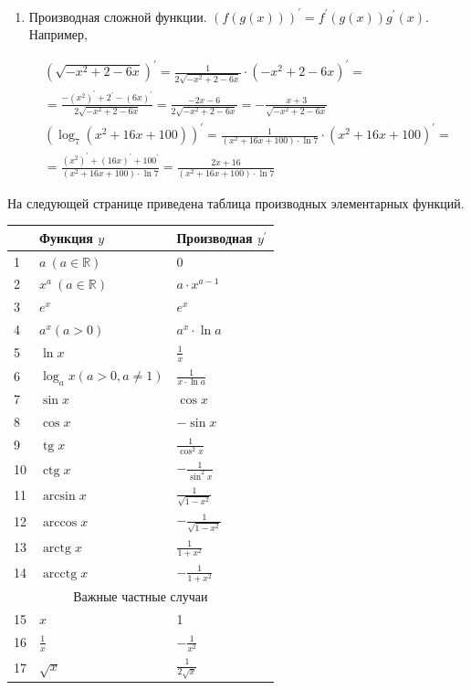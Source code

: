\begin{enumerate}
    \item Производная сложной функции. $(f(g(x)))^{\prime}=f^{\prime}(g(x)) g^{\prime}(x)$. Например,

    $$
    \begin{gathered}
    \left(\sqrt{-x^2+2-6 x}\right)^{\prime}=\frac{1}{2 \sqrt{-x^2+2-6 x}} \cdot\left(-x^2+2-6 x\right)^{\prime}= \\
    =\frac{-\left(x^2\right)^{\prime}+2^{\prime}-(6 x)^{\prime}}{2 \sqrt{-x^2+2-6 x}}=\frac{-2 x-6}{2 \sqrt{-x^2+2-6 x}}=-\frac{x+3}{\sqrt{-x^2+2-6 x}} \\
    \left(\log _7\left(x^2+16 x+100\right)\right)^{\prime}=\frac{1}{\left(x^2+16 x+100\right) \cdot \ln 7} \cdot\left(x^2+16 x+100\right)^{\prime}= \\
    =\frac{\left(x^2\right)^{\prime}+(16 x)^{\prime}+100^{\prime}}{\left(x^2+16 x+100\right) \cdot \ln 7}=\frac{2 x+16}{\left(x^2+16 x+100\right) \cdot \ln 7}
    \end{gathered}
    $$
\end{enumerate}

На следующей странице приведена таблица производных элементарных функций.

\newpage

\hspace{3mm}

\begin{table}[h]
\begin{tabular}{|l|l|l|}
\hline & Функция $y$ & Производная $y^{\prime}$ \\
\hline 1 & $a\ (a \in \mathbb{R})$ & 0 \\
\hline 2 & $x^a\ (a \in \mathbb{R})$ & $a \cdot x^{a-1}$ \\
\hline 3 & $e^x$ & $e^x$ \\
\hline 4 & $a^x(a>0)$ & $a^x \cdot \ln a$ \\
\hline 5 & $\ln x$ & $\frac{1}{x}$ \\
\hline 6 & $\log _a x(a>0, a \neq 1)$ & $\frac{1}{x \cdot \ln a}$ \\
\hline 7 & $\sin x$ & $\cos x$ \\
\hline 8 & $\cos x$ & $-\sin x$ \\
\hline 9 & $\operatorname{tg} x$ & $\frac{1}{\cos ^2 x}$ \\
\hline 10 & $\operatorname{ctg} x$ & $-\frac{1}{\sin ^2 x}$ \\
\hline 11 & $\arcsin x$ & $\frac{1}{\sqrt{1-x^2}}$ \\
\hline 12 & $\arccos x$ & $-\frac{1}{\sqrt{1-x^2}}$ \\
\hline 13 & $\operatorname{arctg} x$ & $\frac{1}{1+x^2}$ \\
\hline 14 & $\operatorname{arcctg} x$ & $-\frac{1}{1+x^2}$ \\
\hline \multicolumn{3}{|c|}{Важные частные случаи} \\
\hline 15 & $x$ & 1 \\
\hline 16 & $\frac{1}{x}$ & $-\frac{1}{x^2}$ \\
\hline 17 & $\sqrt{x}$ & $\frac{1}{2 \sqrt{x}}$ \\
\hline
\end{tabular}
\end{table}